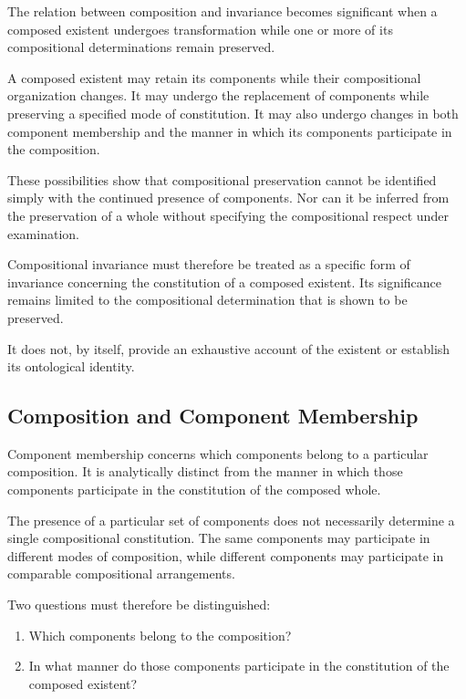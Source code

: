 The relation between composition and invariance becomes
significant when a composed existent undergoes transformation
while one or more of its compositional determinations remain
preserved.

A composed existent may retain its components while their
compositional organization changes. It may undergo the
replacement of components while preserving a specified
mode of constitution. It may also undergo changes in both
component membership and the manner in which its components
participate in the composition.

These possibilities show that compositional preservation
cannot be identified simply with the continued presence
of components. Nor can it be inferred from the preservation
of a whole without specifying the compositional respect
under examination.

Compositional invariance must therefore be treated as a
specific form of invariance concerning the constitution
of a composed existent. Its significance remains limited
to the compositional determination that is shown to be
preserved.

It does not, by itself, provide an exhaustive account
of the existent or establish its ontological identity.

\subsection{Composition and Component Membership}

Component membership concerns which components belong
to a particular composition. It is analytically distinct
from the manner in which those components participate
in the constitution of the composed whole.

The presence of a particular set of components does not
necessarily determine a single compositional constitution.
The same components may participate in different modes
of composition, while different components may participate
in comparable compositional arrangements.

Two questions must therefore be distinguished:

\begin{enumerate}
    \item Which components belong to the composition?
    \item In what manner do those components participate
          in the constitution of the composed existent?
\end{enumerate}

